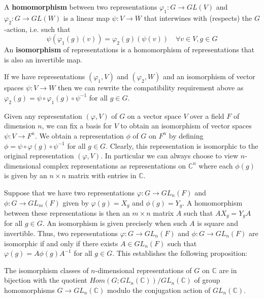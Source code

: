 \begin{defn}
A \textbf{homomorphism} between two representations $\varphi_1 \colon G \to GL(V)$ and $\varphi_2 \colon G \to GL(W)$ is a linear map $\psi \colon V \to W$ that interwines with (respects) the $G$-action, i.e. such that \[ \psi ( \varphi_1 (g)(v)) = \varphi_2(g) (\psi(v)) \quad \forall v \in V, g \in G \]  An \textbf{isomorphism} of representations is a homomorphism of representations that is also an invertible map.
\end{defn}
\begin{note}
If we have representations $(\varphi_1, V)$ and $(\varphi_2, W)$ and an isomorphism of vector spaces $\psi \colon V \to W$ then we can rewrite the compatibility requirement above as $\varphi_2(g) = \psi \circ \varphi_1(g) \circ \psi^{-1}$ for all $g \in G$.
\end{note}

Given any representation $(\varphi, V)$ of $G$ on a vector space $V$ over a field $F$ of dimension $n$, we can fix a basis for $V$ to obtain an isomorphism of vector spaces $\psi \colon V \to F^n$.  We obtain a representation $\phi$ of $G$ on $F^n$ by defining $\phi = \psi \circ \varphi(g) \circ \psi^{-1}$ for all $g \in G$. Clearly, this representation is isomorphic to the original representation $(\varphi, V)$. In particular we can always choose to view $n$-dimensional complex representations as representations on $\mathbb{C}^n$ where each $\phi(g)$ is given by an $n \times n$ matrix with entries in $\mathbb{C}$.

Suppose that we have two representations $\varphi \colon G \to GL_n(F)$ and $\phi \colon G \to GL_m(F)$ given by $\varphi(g) = X_g$ and $\phi(g) = Y_g$.  A homomorphism between these representations is then an $m \times n$ matrix $A$ such that $A X_g = Y_g A$ for all $g \in G$.   An isomorphism is given precisely when such $A$ is square and invertible.  Thus, two representations $\varphi \colon G \to GL_n(F)$ and $\phi \colon G \to GL_n(F)$ are isomorphic if and only if there exists $A \in GL_n(F)$ such that $\varphi(g) = A \phi(g) A^{-1}$ for all $g \in G$.  This establishes the following proposition:
\begin{prop}
The isomorphism classes of $n$-dimensional representations of $G$ on $\mathbb{C}$ are in bijection with the quotient $Hom(G; GL_n(\mathbb{C})) / GL_n(\mathbb{C})$ of group homomorphisms $G \to GL_n(\mathbb{C})$ modulo the conjugation action of $GL_n(\mathbb{C})$.
\end{prop}



